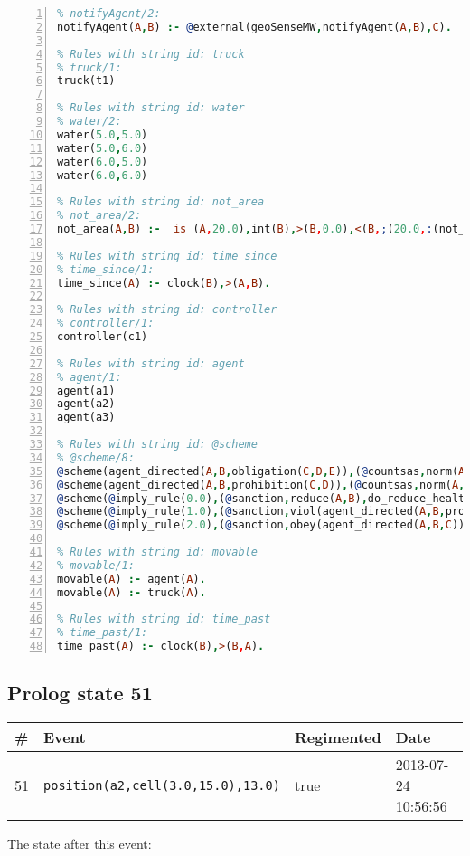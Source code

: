 \documentclass[11pt]{article}\usepackage[utf8]{inputenc}\usepackage{geometry}
\begin{document}
\begin{lstlisting}[language=Prolog, numbers=left]
% Rules with string id: notifyAgent
% notifyAgent/2:
notifyAgent(A,B) :- @external(geoSenseMW,notifyAgent(A,B),C).

% Rules with string id: truck
% truck/1:
truck(t1)

% Rules with string id: water
% water/2:
water(5.0,5.0)
water(5.0,6.0)
water(6.0,5.0)
water(6.0,6.0)

% Rules with string id: not_area
% not_area/2:
not_area(A,B) :-  is (A,20.0),int(B),>(B,0.0),<(B,;(20.0,:(not_area(A,B), is (-(B),20.0)))),int(A),>(A,0.0),<(A,;(20.0,:(area(A,B),-(int(A))))),int(B),>(A,0.0),>(B,0.0),<(A,21.0),<(B,21.0).

% Rules with string id: time_since
% time_since/1:
time_since(A) :- clock(B),>(A,B).

% Rules with string id: controller
% controller/1:
controller(c1)

% Rules with string id: agent
% agent/1:
agent(a1)
agent(a2)
agent(a3)

% Rules with string id: @scheme
% @scheme/8:
@scheme(agent_directed(A,B,obligation(C,D,E)),(@countsas,norm(A,B,F,obligation(C,D,E)),F),false,(listTrue(C)),(time_past(D)),false,[plus(viol(agent_directed(A,B,obligation(C,D,E))))|[]],[plus(obey(agent_directed(A,B,obligation(C,D,E))))|[]])
@scheme(agent_directed(A,B,prohibition(C,D)),(@countsas,norm(A,B,E,prohibition(C,D)),E),(listTrue(C)),false,(false),false,[plus(viol(agent_directed(A,B,prohibition(C,D))))|[]],[plus(obey(agent_directed(A,B,prohibition(C,D))))|[]])
@scheme(@imply_rule(0.0),(@sanction,reduce(A,B),do_reduce_health(A,B),notifyAgent(A,changed(status))),true,false,false,false,[min(reduce(A,B))|[]],[])
@scheme(@imply_rule(1.0),(@sanction,viol(agent_directed(A,B,prohibition(C,D))),do_sanction(D)),true,false,false,false,[min(viol(agent_directed(A,B,prohibition(C,D))))|[]],[])
@scheme(@imply_rule(2.0),(@sanction,obey(agent_directed(A,B,C))),true,false,false,false,[min(obey(agent_directed(A,B,C)))|[]],[])

% Rules with string id: movable
% movable/1:
movable(A) :- agent(A).
movable(A) :- truck(A).

% Rules with string id: time_past
% time_past/1:
time_past(A) :- clock(B),>(B,A).

\end{lstlisting}
\clearpage 
\subsection{Prolog state 51}
\begin{table}[ht]
\centering 
\begin{tabular}{l l l l} 
\textbf{\#} & \textbf{Event} & \textbf{Regimented} & \textbf{Date} \\ [0.5ex] 
\hline
51&\texttt{position(a2,cell(3.0,15.0),13.0)}&true&2013-07-24 10:56:56\\ [1ex] \hline\end{tabular}
\end{table}
The state after this event:
\end{document}
